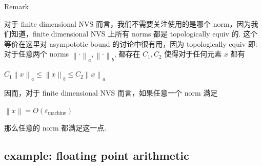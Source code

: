 \begin{qlremark}{Remark}

对于 finite dimensional NVS 而言，我们不需要关注使用的是哪个 norm，因为我们知道，finite dimensional NVS 上所有 norms 都是 topologically equiv 的. 这个等价在这里对 asympototic bound 的讨论中很有用，因为 topologically equiv 即: 对于任意两个 norms \(\left\| \cdot \right\|_{a},\left\| \cdot \right\|_{b}\), 都存在 \(C_{1},C_{2}\) 使得对于任何元素 \(x\) 都有

\(C_{1}\left\| x \right\|_{a} \leq \left\| x \right\|_{b} \leq C_{2}\left\| x \right\|_{a}\)

因而，对于 finite dimensional NVS 而言，如果任意一个 norm 满足

\(\left\| x \right\| = O\left( \varepsilon_{\text{machine}} \right)\)

那么任意的 norm 都满足这一点.

\end{qlremark}

\subsection{example: floating point arithmetic}

